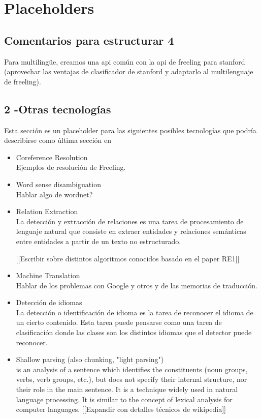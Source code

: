
\section{Placeholders}

\subsection{Comentarios para estructurar 4}
Para multilingüe, creamos una api común con la api de freeling para stanford (aprovechar las ventajas de clasificador de stanford y adaptarlo al multilenguaje de freeling). 

\subsection{2 -Otras tecnologías}
Esta sección es un placeholder para las siguientes posibles tecnologías que podría describirse como última sección en 
\begin{itemize}
  \item Coreference Resolution \\
  Ejemplos de resolución de Freeling.
  \item Word sense disambiguation \\
  Hablar algo de wordnet?
  \item Relation Extraction \\
  La detección y extracción de relaciones es una tarea de procesamiento
de lenguaje natural que consiste en extraer entidades y relaciones semánticas
entre entidades a partir de un texto no estructurado. 

[[Escribir sobre distintos algoritmos conocidos basado en el paper RE1]]
  \item Machine Translation \\
    Hablar de los problemas con Google y otros y de las memorias de traducción. 
  \item Detección de idiomas \\
  La detección o identificación de idioma es la tarea de reconocer el
idioma de un cierto contenido. Esta tarea puede pensarse como una
tarea de clasificación donde las clases son los distintos
idiomas que el detector puede reconocer. 
  \item Shallow parsing (also chunking, "light parsing") \\
  is an analysis of a sentence which identifies the constituents (noun groups, verbs, verb groups, etc.), but does not specify their internal structure, nor their role in the main sentence.
It is a technique widely used in natural language processing. It is similar to the concept of lexical analysis for computer languages.
[[Expandir con detalles técnicos de wikipedia]]
\end{itemize}


